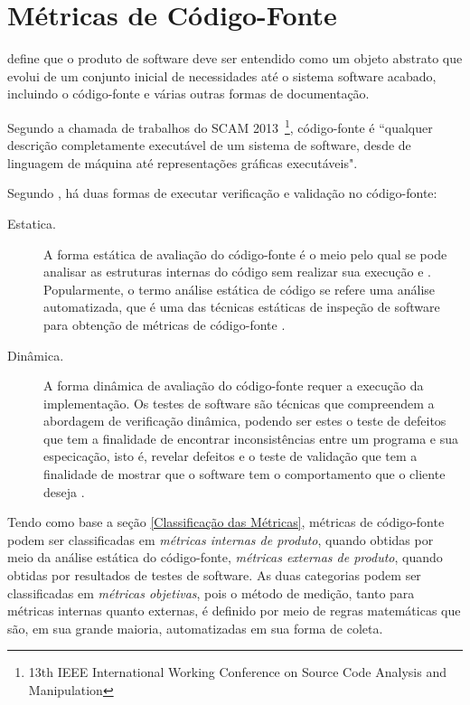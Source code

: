 	
	\section {Métricas de Código-Fonte}
	\label {Métricas de Código-Fonte}
	
	 define que o produto de software deve ser entendido como um objeto abstrato que evolui de um conjunto inicial de necessidades até o sistema software acabado, incluindo o código-fonte e várias outras formas de documentação.
	
	Segundo a chamada de trabalhos do SCAM 2013~\footnote{13th IEEE International Working Conference on Source Code Analysis and Manipulation}, código-fonte é “qualquer descrição completamente executável de um sistema de software, desde de linguagem de máquina até representações gráficas executáveis".
	

	Segundo , há duas formas de executar verificação e validação no código-fonte:
	
	\begin{description}
	
	\item[Estatica.] A forma estática de avaliação do código-fonte é o meio pelo qual se pode analisar as estruturas internas do código sem realizar sua execução \cite{Wichmann95} e \cite{Nielson:1999}. Popularmente, o termo análise estática de código se refere uma análise automatizada, que é uma das técnicas estáticas de inspeção de software para obtenção de métricas de código-fonte \cite{Terra2008} \cite{Emanuelsson2008}.

	\item[Dinâmica.] A forma dinâmica de avaliação do código-fonte requer a execução da implementação. Os testes de software são técnicas que compreendem a abordagem de verificação dinâmica, podendo ser estes o teste de defeitos que tem a finalidade de encontrar inconsistências entre um programa e sua especicação, isto é, revelar defeitos e o teste de validação que tem a finalidade de mostrar que o software tem o comportamento que o cliente deseja \cite{Sommerville10}. 

	\end{description}

		Tendo como base a seção \ref{Classificação das Métricas}, métricas de código-fonte podem ser classificadas em \textit{métricas internas de produto}, quando obtidas por meio da análise estática do código-fonte, \textit{métricas externas de produto}, quando obtidas por resultados de testes de software. As duas categorias podem ser classificadas em \textit{métricas objetivas}, pois o método de medição, tanto para métricas internas quanto externas, é definido por meio de regras matemáticas que são, em sua grande maioria, automatizadas em sua forma de coleta.

